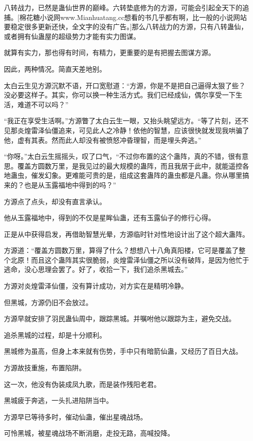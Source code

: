 \begin{this_body}
八转战力，已然是蛊仙世界的巅峰。六转垫底修为的方源，可能会引起全天下的追捕。[棉花糖小说网www.Mianhuatang.cc想看的书几乎都有啊，比一般的小说网站要稳定很多更新还快，全文字的没有广告。]那么八转战力的方源，只有八转蛊仙，或者拥有仙蛊屋的超级势力才能有实力图谋。

就算有实力，那也得有时间，有精力，更重要的是有把握去图谋方源。

因此，两种情况。简直天差地别。

太白云生见方源沉默不语，开口宽慰道：“方源，你是不是把自己逼得太狠了些？没必要这样子。其实，你可以换一种生活方式。我们已经成仙，偶尔享受一下生活，难道不可以吗？”

“我正在享受生活啊。”方源瞥了太白云生一眼，又抬头眺望远方。“等了片刻，还不见那炎煌雷泽仙僵追来，可见此人之冷静！依他的智慧，应该很快就发现我哄骗了他，虚有其表。然而此人却没有被愤怒冲昏理智，而是埋头奔逃。”

“你呀。”太白云生摇摇头，叹了口气，“不过你布置的这个蛊阵，真的不错，很有意思。覆盖方圆数万里，是我见过的最大规模的蛊阵，而且我居于此中，就能遥控各地蛊虫，催发幻象。更难能可贵的是，组成这套蛊阵的蛊虫都是凡蛊。你从哪里搞来的？也是从玉露福地中得到的吗？”

方源点了点头，却没有直言承认。

他从玉露福地中，得到的不仅是星眸仙蛊，还有玉露仙子的修行心得。

正是从中获得启发，再借助智慧光晕，方源临时针对性地设计出了这个超大蛊阵。

方源道：“覆盖方圆数万里，算得了什么？想想八十八角真阳楼，它可是覆盖了整个北原！而且这个蛊阵其实很脆弱，炎煌雷泽仙僵之所以没有破阵，是因为他忙于逃命，没心思理会罢了。好了，收拾一下，我们追杀黑城去。”

方源对炎煌雷泽仙僵，没有算计成功，对方实在是精明冷静。

但黑城，方源仍旧不会放过。

方源早就安排了羽民蛊仙周中，跟踪黑城。并嘱咐他以跟踪为主，避免交战。

追杀黑城的过程，却是十分顺利。

黑城修为虽高，但身上本来就有伤势，手中只有暗箭仙蛊，又经历了百日大战。

方源故技重施，布置陷阱。

这一次，他没有伪装成凤九歌，而是装作残阳老君。

黑城疲于奔逃，一头扎进陷阱当中。

方源早已等待多时，催动仙蛊，催出星魂战场。

可怜黑城，被星魂战场不断消磨，走投无路，高喊投降。


\end{this_body}
